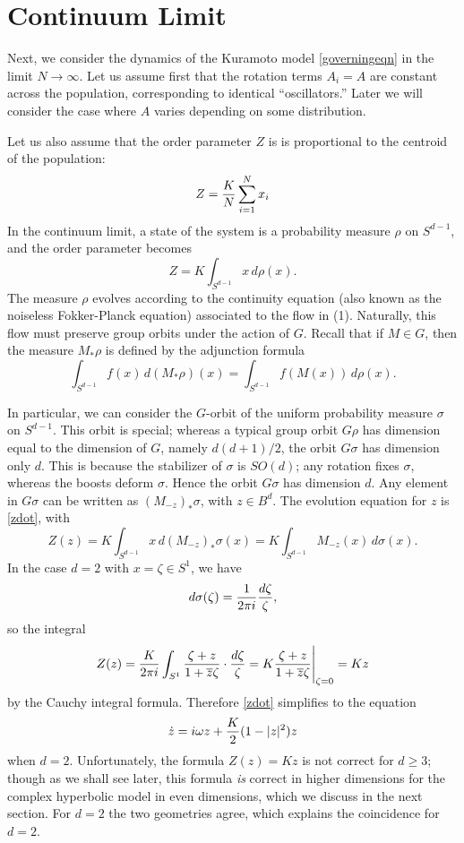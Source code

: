 \documentclass[%
 aip,
 amsmath,amssymb,
 reprint,%
]{revtex4-1}
\begin{document}

\section{\label{sec:level1}Continuum Limit}

Next, we consider the dynamics of the Kuramoto model \eqref{governingeqn} in the limit $N \to \infty$.  Let us assume first that the rotation terms $A_i = A$ are constant across the population, corresponding to identical ``oscillators.'' Later we will consider the case where $A$ varies depending on some distribution.  

Let us also assume that the order parameter $Z$ is is proportional to the centroid of the population: 
$$
Z = {K \over N} \sum_{i = 1}^N x_i
$$
In the continuum limit, a state of the system is a probability measure $\rho$ on $S^{d-1}$, and the order parameter becomes 
$$
Z = K \int_{S^{d-1}} x \, d \rho(x).
$$
The measure $\rho$ evolves according to the  continuity equation (also known as the noiseless Fokker-Planck equation) associated to the flow in (1).  Naturally, this flow must preserve group orbits under the action of $G$.  Recall that if $M \in G$, then the measure $M_\ast \rho$ is defined by the adjunction formula
$$
\int_{S^{d-1}} f (x) \, d (M_\ast \rho)  (x) = \int_{S^{d-1}} f(M (x))  \, d \rho (x) .
$$

In particular, we can consider the $G$-orbit of the uniform probability measure $\sigma$ on $S^{d-1}$. This orbit is special; whereas a typical group orbit $G \rho$ has dimension equal to the dimension of $G$, namely $d(d+1)/2$, the orbit $G \sigma$ has dimension only $d$.  This is because the stabilizer of $\sigma$ is $SO(d)$; any rotation fixes $\sigma$, whereas the boosts deform $\sigma$.  Hence the orbit $G \sigma$ has dimension $d$.  Any element in $G \sigma$ can be written as $(M_{-z})_\ast \sigma$, with $z \in B^d$.  The evolution equation for $z$ is \eqref{zdot}, with
\begin{equation}
Z(z) = K \int_{S^{d-1}} x \, d (M_{-z})_\ast \sigma(x) = K \int_{S^{d-1}} M_{-z} (x) \, d \sigma(x). 
\label{Zz}
\end{equation}
In the case $d =2$ with $x = \zeta \in S^1$, we have
$$
d\sigma(\zeta) = {1 \over 2 \pi i } {d \zeta \over \zeta},
$$
so the integral 
$$
Z(z)  = {K \over 2 \pi i} \int _{S^1} {\zeta+z \over 1+\overline z \zeta } \cdot {d\zeta \over \zeta} = K {\zeta+z \over 1+\overline z \zeta } \Biggr |_{\zeta = 0}  = K z
$$
by the Cauchy integral formula.  Therefore \eqref{zdot} simplifies to the equation
$$
\dot z = i \omega z + {K \over 2} (1-|z|^2) z
$$
when $d=2$.  Unfortunately, the formula $Z(z) = Kz$ is not correct for $d \ge 3$; though as we shall see later, this formula \emph{is} correct in higher dimensions for the complex hyperbolic model in even dimensions, which we discuss in the next section.  For $d=2$ the two geometries agree, which explains the coincidence for $d=2$. 
\end{document}
